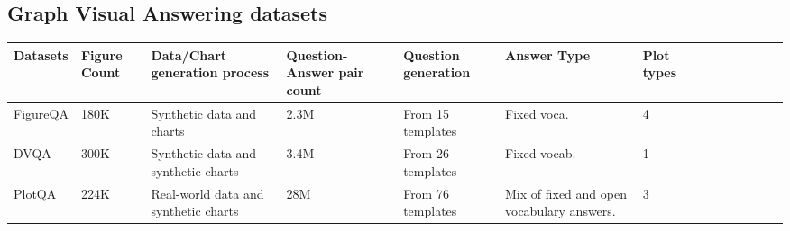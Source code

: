 \documentclass{article}
\begin{document}
\subsection{Graph Visual Answering datasets}
\begin{table}[!htbp]
\renewcommand{\arraystretch}{1.3}
\begin{adjustbox}{max width=\textwidth}
\begin{tabular}{p{2.33cm}p{2.33cm}p{2.33cm}p{2.33cm}p{2.33cm}p{2.33cm}p{2.99cm}p{2.33cm}p{2.33cm}p{2.33cm}p{2.33cm}p{2.33cm}p{2.33cm}p{2.99cm}}
\hline
\multicolumn{1}{|p{2.33cm}}{Datasets} & 
\multicolumn{1}{|p{2.33cm}}{Figure Count} & 
\multicolumn{1}{|p{2.33cm}}{Data/Chart generation process} & 
\multicolumn{1}{|p{2.33cm}}{Question-Answer pair count} & 
\multicolumn{1}{|p{2.33cm}}{Question generation} & 
\multicolumn{1}{|p{2.33cm}}{Answer Type} & 
\multicolumn{1}{|p{2.99cm}|}{ Plot types} \\ 
\hline
\multicolumn{1}{|p{2.33cm}}{FigureQA \cite{kahou2017figureqa}} & 
\multicolumn{1}{|p{2.33cm}}{180K} & 
\multicolumn{1}{|p{2.33cm}}{Synthetic data and charts} & 
\multicolumn{1}{|p{2.33cm}}{2.3M } & 
\multicolumn{1}{|p{2.33cm}}{From 15 templates} & 
\multicolumn{1}{|p{2.33cm}}{Fixed voca. } & 
\multicolumn{1}{|p{2.99cm}|}{4} \\ 
\hline
\multicolumn{1}{|p{2.33cm}}{DVQA \cite{kafle2018}} & 
\multicolumn{1}{|p{2.33cm}}{300K} & 
\multicolumn{1}{|p{2.33cm}}{Synthetic  data and synthetic charts} & 
\multicolumn{1}{|p{2.33cm}}{3.4M} & 
\multicolumn{1}{|p{2.33cm}}{From 26 templates} & 
\multicolumn{1}{|p{2.33cm}}{Fixed vocab. } & 
\multicolumn{1}{|p{2.99cm}|}{1} \\ 
\hline
\multicolumn{1}{|p{2.33cm}}{PlotQA \cite{methani2020plotqa}} & 
\multicolumn{1}{|p{2.33cm}}{224K} & 
\multicolumn{1}{|p{2.33cm}}{Real-world data and synthetic charts} & 
\multicolumn{1}{|p{2.33cm}}{28M} & 
\multicolumn{1}{|p{2.33cm}}{From 76 templates } & 
\multicolumn{1}{|p{2.33cm}}{Mix of fixed and open vocabulary answers. } & 
\multicolumn{1}{|p{2.99cm}|}{3 \newline
} \\ 


\end{tabular}
\end{adjustbox}
\end{table}
\end{document}
